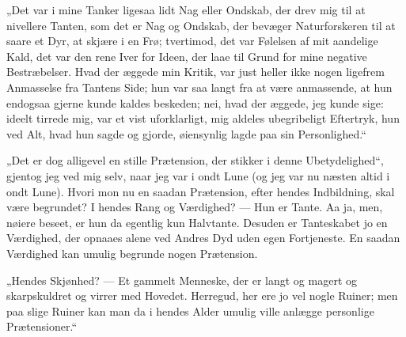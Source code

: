 \documentclass[12pt,a4paper]{book}
\begin{document}
„Det var i mine Tanker ligesaa lidt Nag eller Ondskab, der drev mig til at nivellere Tanten, som det er Nag og Ondskab, der bevæger Naturforskeren til at saare et Dyr, at skjære i en Frø; tvertimod, det var Følelsen af mit aandelige Kald, det var den rene Iver for Ideen, der laae til Grund for mine negative Bestræbelser. Hvad der æggede min Kritik, var just heller ikke nogen ligefrem Anmasselse fra Tantens Side; hun var saa langt fra at være anmassende, at hun endogsaa gjerne kunde kaldes beskeden; nei, hvad der æggede, jeg kunde sige: ideelt tirrede mig, var et vist uforklarligt, mig aldeles ubegribeligt Eftertryk, hun ved Alt, hvad hun sagde og gjorde, øiensynlig lagde paa sin Personlighed.“

„Det er dog alligevel en stille Prætension, der stikker i denne Ubetydelighed“, gjentog jeg ved mig selv, naar jeg var i ondt Lune (og jeg var nu næsten altid i ondt Lune). Hvori mon nu en saadan Prætension, efter hendes Indbildning, skal være begrundet? I hendes Rang og Værdighed? — Hun er Tante. Aa ja, men, nøiere beseet, er hun da egentlig kun Halvtante. Desuden er Tanteskabet jo en Værdighed, der opnaaes alene ved Andres Dyd uden egen Fortjeneste. En saadan Værdighed kan umulig begrunde nogen Prætension.

„Hendes Skjønhed? — Et gammelt Menneske, der er langt og magert og skarpskuldret og virrer med Hovedet. Herregud, her ere jo vel nogle Ruiner; men paa slige Ruiner kan man da i hendes Alder umulig ville anlægge personlige Prætensioner.“
\end{document}
